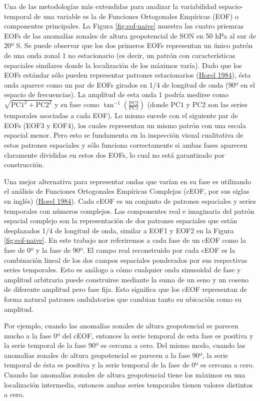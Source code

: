 \documentclass[12pt,oneside,a4paper]{reedthesis}
\begin{document}
Una de las metodologías más extendidas para analizar la variabilidad espacio-temporal de una variable es la de Funciones Ortogonales Empíricas (EOF) o componentes principales.
La Figura \ref{fig:eof-naive} muestra las cuatro priemras EOFs de las anomalías zonales de altura geopotencial de SON en 50 hPa al sur de 20º S.
Se puede observar que los dos primeros EOFs representan un único patrón de una onda zonal 1 no estacionario (es decir, un patrón con características espaciales similares donde la localización de los máximos varía).
Dado que los EOFs estándar sólo pueden representar patrones estacionarios (\protect\hyperlink{ref-horel1984}{Horel 1984}), ésta onda aparece como un par de EOFs girados en 1/4 de longitud de onda (90º en el espacio de frecuencias).
La amplitud de esta onda 1 podría medirse como \(\sqrt{\mathrm{PC1}^2 + \mathrm{PC2}^2}\) y su fase como \(\tan^{-1} \left ( \frac{\mathrm{PC2}}{\mathrm{PC1}} \right )\) (donde \(\mathrm{PC1}\) y \(\mathrm{PC2}\) son las series temporales asociadas a cada EOF).
Lo mismo sucede con el siguiente par de EOFs (EOF3 y EOF4), los cuales representan un mismo patrón con una escala espacial menor.
Pero esto se fundamenta en la inspección visual cualitativa de estos patrones espaciales y sólo funciona correctamente si ambas fases aparecen claramente divididas en estos dos EOFs, lo cual no está garantizado por construcción.

Una mejor alternativa para representar ondas que varían en su fase es utilizando el análisis de Funciones Ortogonales Empíricas Complejas (cEOF, por sus siglas en inglés) (\protect\hyperlink{ref-horel1984}{Horel 1984}).
Cada cEOF es un conjunto de patrones espaciales y series temporales con números complejos.
Las componentes real e imaginaria del patrón espacial complejo son la representación de dos patrones espaciales que están desplazados 1/4 de longitud de onda, similar a EOF1 y EOF2 en la Figura \ref{fig:eof-naive}.
En este trabajo nor referiremos a cada fase de un cEOF como la fase de 0º y la fase de 90º.
El campo real reconstruido por cada cEOF es la combinación lineal de los dos campos espaciales ponderados por sus respectivas series temporales.
Esto es análogo a cómo cualquier onda sinusoidal de fase y amplitud arbitraria puede construirse mediante la suma de un seno y un coseno de diferente amplitud pero fase fija.
Esto significa que los cEOF representan de forma natural patrones ondulatorios que cambian tanto su ubicación como su amplitud.

Por ejemplo, cuando las anomalías zonales de altura geopotencial se parecen mucho a la fase 0º del cEOF, entonces la serie temporal de esta fase es positiva y la serie temporal de la fase 90º es cercana a cero.
Del mismo modo, cuando las anomalías zonales de altura geopotencial se parecen a la fase 90º, la serie temporal de ésta es positiva y la serie temporal de la fase de 0º es cercana a cero.
Cuando las anomalías zonales de altura geopotencial tiene los máximos en una localización intermedia, entonces ambas series temporales tienen valores distintos a cero.
\end{document}
